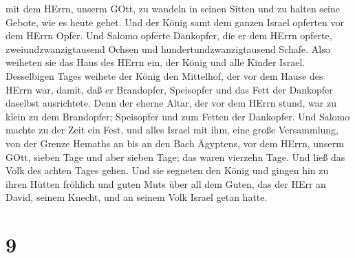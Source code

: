 mit dem HErrn, unserm GOtt, zu wandeln in seinen Sitten und zu halten
seine Gebote, wie es heute gehet.  Und der König samt dem
ganzen Israel opferten vor dem HErrn Opfer.  Und Salomo
opferte Dankopfer, die er dem HErrn opferte, zweiundzwanzigtausend
Ochsen und hundertundzwanzigtausend Schafe. Also weiheten sie das Haus
des HErrn ein, der König und alle Kinder Israel. 
Desselbigen Tages weihete der König den Mittelhof, der vor dem Hause des
HErrn war, damit, daß er Brandopfer, Speisopfer und das Fett der
Dankopfer daselbst ausrichtete. Denn der eherne Altar, der vor dem HErrn
stund, war zu klein zu dem Brandopfer; Speisopfer und zum Fetten der
Dankopfer.  Und Salomo machte zu der Zeit ein Fest, und
alles Israel mit ihm, eine große Versammlung, von der Grenze Hemaths an
bis an den Bach Ägyptens, vor dem HErrn, unserm GOtt, sieben Tage und
aber sieben Tage; das waren vierzehn Tage.  Und ließ das
Volk des achten Tages gehen. Und sie segneten den König und gingen hin
zu ihren Hütten fröhlich und guten Muts über all dem Guten, das der HErr
an David, seinem Knecht, und an seinem Volk Israel getan hatte.

\hypertarget{section-8}{%
\section{9}\label{section-8}}

